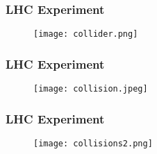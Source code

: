 \documentclass[8pt]{beamer}
\begin{document}
\begin{frame}
\frametitle{LHC Experiment}
\begin{figure}[ht!]
\texttt{[image: collider.png]}
\end{figure}
\end{frame}

\begin{frame}
\frametitle{LHC Experiment}
\begin{figure}[ht!]
\texttt{[image: collision.jpeg]}
\end{figure}
\end{frame}

\begin{frame}
	\frametitle{LHC Experiment}
	\begin{figure}[ht!]
		\texttt{[image: collisions2.png]}
	\end{figure}
\end{frame}

\end{document}
